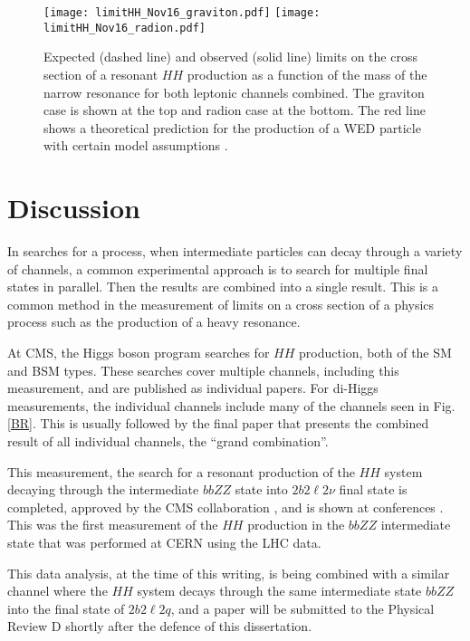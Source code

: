 \begin{figure}[H] 
\begin{center}
\texttt{[image: limitHH\_Nov16\_graviton.pdf]}
\texttt{[image: limitHH\_Nov16\_radion.pdf]}
\caption[The expected and observed limits.]{ Expected (dashed line) and observed (solid line) limits on the cross section of a resonant $HH$ production
as a function of the mass of the narrow resonance for both leptonic channels combined. The graviton case is shown at the top and radion case at the bottom. The red line shows a theoretical prediction for
the production of a WED particle with certain model assumptions \cite{Oliveira:2014kla}.}
\label{fig:HHlimits} 
\end{center}
\end{figure}

\section{Discussion}
\label{sec:Discussion}

In searches for a process, when intermediate particles can decay through a variety of channels, a common experimental approach is to search for multiple final states in parallel. Then the results are combined into a single result. This is a common method in the measurement of limits on a cross section of a physics process such as the production of a heavy resonance.

At CMS, the Higgs boson program searches for $HH$ production, both of the SM and BSM types. These searches cover multiple channels, including this measurement, and are published as individual papers. For di-Higgs measurements, the individual channels include many of the channels seen in Fig. \ref{BR}. This is usually followed by the final paper that presents the combined result of all individual channels, the ``grand combination''.

This measurement, the search for a resonant production of the $HH$ system decaying through the intermediate $bbZZ$ state into $2 b 2 \ell 2 \nu$ final state is completed, approved by the CMS collaboration \cite{CMS-PAS-HIG-17-032}, and is shown at conferences \cite{HiggsCouplings2018}. This was the first measurement of the $HH$ production in the $bbZZ$ intermediate state that was performed at CERN using the LHC data. 

This data analysis, at the time of this writing, is being combined with a similar channel where the $HH$ system decays through the same intermediate state $bbZZ$ into the final state of $2 b 2 \ell 2 q$, and a paper will be submitted to the Physical Review D shortly after the defence of this dissertation.

